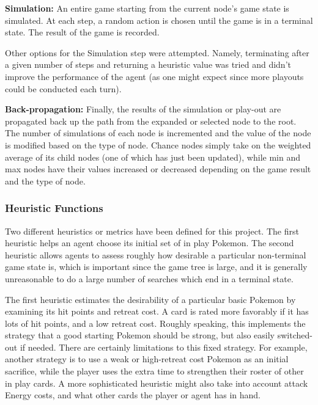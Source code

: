 \documentclass{article}
\begin{document}
\textbf{Simulation: } An entire game starting from the current node's game state is simulated. At each step, a random action is chosen until the game is in a terminal state. The result of the game is recorded.

Other options for the Simulation step were attempted. Namely, terminating after a given number of steps and returning a heuristic value was tried and didn't improve the performance of the agent (as one might expect since more playouts could be conducted each turn).

\textbf{Back-propagation: } Finally, the results of the simulation or play-out are propagated back up the path from the expanded or selected node to the root. The number of simulations of each node is incremented and the value of the node is modified based on the type of node. Chance nodes simply take on the weighted average of its child nodes (one of which has just been updated), while min and max nodes have their values increased or decreased depending on the game result and the type of node. 



\subsubsection{Heuristic Functions} %
Two different heuristics or metrics have been defined for this project.  The first heuristic helps an agent choose its initial set of in play Pokemon.  The second heuristic allows agents to assess roughly how desirable a particular non-terminal game state is, which is important since the game tree is large, and it is generally unreasonable to do a large number of searches which end in a terminal state.

The first heuristic estimates the desirability of a particular basic Pokemon by examining its hit points and retreat cost.  A card is rated more favorably if it has lots of hit points, and a low retreat cost.  Roughly speaking, this implements the strategy that a good starting Pokemon should be strong, but also easily switched-out if needed.  There are certainly limitations to this fixed strategy.  For example, another strategy is to use a weak or high-retreat cost Pokemon as an initial sacrifice, while the player uses the extra time to strengthen their roster of other in play cards.  A more sophisticated heuristic might also take into account attack Energy costs, and what other cards the player or agent has in hand.
\end{document}
